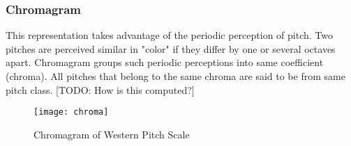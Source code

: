 \subsubsection{Chromagram}

This representation takes advantage of the periodic perception of pitch. Two pitches are perceived similar in "color" if they differ by one or several octaves apart. Chromagram groups such periodic perceptions into same coefficient (chroma). All pitches that belong to the same chroma are said to be from same pitch class. [TODO: How is this computed?]
\begin{figure}[h] 
\centering
\texttt{[image: chroma]}
\caption{Chromagram of Western Pitch Scale}
 \label{fig:Chromagram}
 \end{figure}
\bigskip